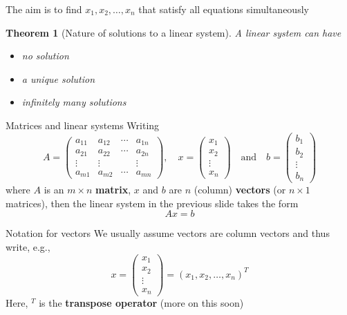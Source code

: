 \documentclass{beamer}
\newtheorem{importanttheorem}[theorem]{Theorem}
\begin{document}
\begin{frame}
The aim is to find $x_1,x_2,\ldots,x_n$ that satisfy all equations simultaneously
\vfill
\begin{importanttheorem}[Nature of solutions to a linear system]
\label{th:nature_solutions_linear_system}
A linear system can have
\begin{itemize}
	\item no solution
	\item a unique solution
	\item infinitely many solutions
\end{itemize}
\end{importanttheorem}
\end{frame}


\begin{frame}{Matrices and linear systems}
Writing
$$
A=
\begin{pmatrix}
a_{11} & a_{12} & \cdots & a_{1n} \\
a_{21} & a_{22} & \cdots & a_{2n} \\
\vdots &\vdots & & \vdots \\
a_{m1} & a_{m2} & \cdots & a_{mn}
\end{pmatrix},\quad
x=
\begin{pmatrix}
x_1\\ x_2 \\ \vdots \\ x_n
\end{pmatrix}
\quad\textrm{and}\quad
b=
\begin{pmatrix}
b_1\\ b_2 \\ \vdots \\ b_n
\end{pmatrix}
$$
where $A$ is an $m\times n$ \textbf{matrix}, $x$ and $b$ are $n$ (column) \textbf{vectors} (or $n\times 1$ matrices), then the linear system in the previous slide takes the form
$$
Ax=b  
$$
\end{frame}



\begin{frame}{Notation for vectors}
We usually assume vectors are column vectors and thus write, e.g.,
$$
x=
\begin{pmatrix}
x_1\\ x_2 \\ \vdots \\ x_n
\end{pmatrix}
= (x_1,x_2,\ldots,x_n)^T
$$
Here, $^T$ is the \textbf{transpose operator} (more on this soon)
\end{frame}
\end{document}
